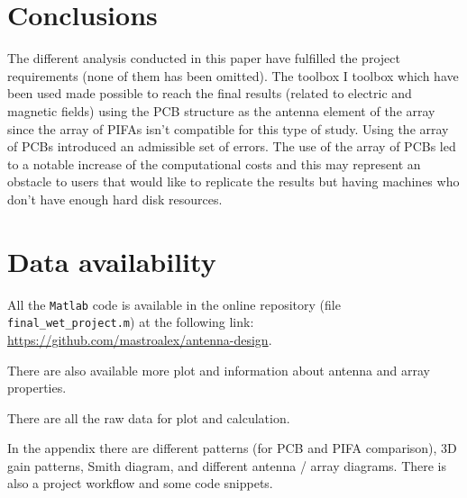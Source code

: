 \documentclass[10 pt,a4paper,twocolumn]{article}
\begin{document}
{\section*{Conclusions}
The different analysis conducted in this paper have fulfilled the project requirements (none of them has been omitted). 
The toolbox
I toolbox which have been used made possible to reach the final results (related to electric and magnetic fields) using the PCB structure as the antenna element of the array since the array of PIFAs isn't compatible for this type of study. Using the array of PCBs introduced an admissible set of errors. The use of the array of PCBs led to a notable increase of the computational costs  and this may represent an obstacle to users that would like to replicate the results but having machines who don't have enough hard disk resources. 


\section*{Data availability}

All the \texttt{Matlab} code is available in the online repository (file \texttt{final\_wet\_project.m}) at the following link: \url{https://github.com/mastroalex/antenna-design}.

There are also available more plot and information about antenna and array properties. 

There are all the raw data for plot and calculation.

In the appendix there are different patterns (for PCB and PIFA comparison), 3D gain patterns, Smith diagram, and different antenna / array diagrams. There is also a project workflow and some code snippets. 

		\printbibliography

\pagebreak
\appendix

	

}
\end{document}
